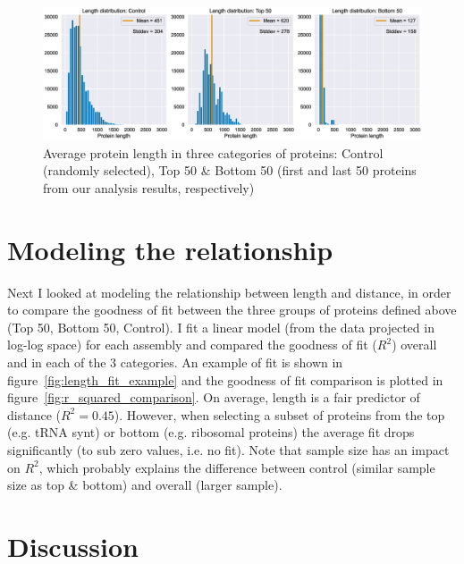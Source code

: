\documentclass[12pt]{article}
\begin{document}
\begin{figure}[!htb]
\hspace*{-1.7cm}
\includegraphics[scale = .45]{average_protein_length.eps}
\caption{Average protein length in three categories of proteins: Control (randomly selected), Top 50 \& Bottom 50 (first and last 50 proteins from our analysis results, respectively)}
\label{fig:average_protein_length}
\end{figure}

\pagebreak

\section{Modeling the relationship}

Next I looked at modeling the relationship between length and distance, in order to compare the goodness of fit between the three groups of proteins defined above (Top 50, Bottom 50, Control).
\newline
\newline
I fit a linear model (from the data projected in log-log space) for each assembly and compared the goodness of fit ($R^2$) overall and in each of the 3 categories. An example of fit is shown in figure~\ref{fig:length_fit_example} and the goodness of fit comparison is plotted in figure~\ref{fig:r_squared_comparison}.
\newline
\newline
On average, length is a fair predictor of distance ($R^2 = 0.45$). However, when selecting a subset of proteins from the top (e.g. tRNA synt) or bottom (e.g. ribosomal proteins) the average fit drops significantly (to sub zero values, i.e. no fit).
\newline
\newline
Note that sample size has an impact on $R^2$, which probably explains the difference between control (similar sample size as top \& bottom) and overall (larger sample).

\section{Discussion}
\end{document}
